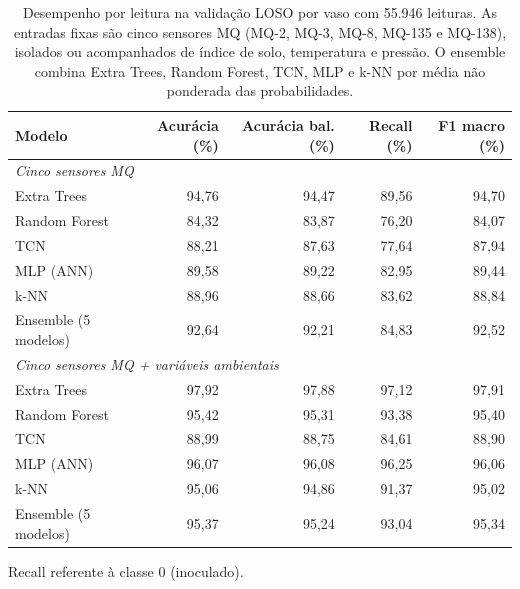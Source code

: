 \begin{table}[H]
\centering
\footnotesize
\setlength{\tabcolsep}{4pt}
\caption{Desempenho por leitura na validação LOSO por vaso com 55.946 leituras. As entradas fixas são cinco sensores MQ (MQ-2, MQ-3, MQ-8, MQ-135 e MQ-138), isolados ou acompanhados de índice de solo, temperatura e pressão. O ensemble combina Extra Trees, Random Forest, TCN, MLP e k-NN por média não ponderada das probabilidades.}
\label{tab:loso_modelos}
\begin{tabular}{lrrrr}
\toprule
Modelo & Acurácia (\%) & Acurácia bal. (\%) & Recall (\%) & F1 macro (\%) \\
\midrule
\multicolumn{5}{l}{\textit{Cinco sensores MQ}} \\
Extra Trees & 94,76 & 94,47 & 89,56 & 94,70 \\
Random Forest & 84,32 & 83,87 & 76,20 & 84,07 \\
TCN & 88,21 & 87,63 & 77,64 & 87,94 \\
MLP (ANN) & 89,58 & 89,22 & 82,95 & 89,44 \\
k-NN & 88,96 & 88,66 & 83,62 & 88,84 \\
Ensemble (5 modelos) & 92,64 & 92,21 & 84,83 & 92,52 \\
\midrule
\multicolumn{5}{l}{\textit{Cinco sensores MQ + variáveis ambientais}} \\
Extra Trees & 97,92 & 97,88 & 97,12 & 97,91 \\
Random Forest & 95,42 & 95,31 & 93,38 & 95,40 \\
TCN & 88,99 & 88,75 & 84,61 & 88,90 \\
MLP (ANN) & 96,07 & 96,08 & 96,25 & 96,06 \\
k-NN & 95,06 & 94,86 & 91,37 & 95,02 \\
Ensemble (5 modelos) & 95,37 & 95,24 & 93,04 & 95,34 \\
\bottomrule
\end{tabular}

\vspace{0.1cm}
\parbox{\linewidth}{\footnotesize Recall referente à classe 0
(inoculado).}
\end{table}
